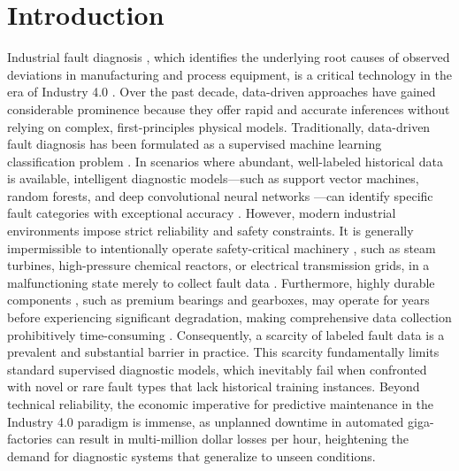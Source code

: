\section{Introduction}

Industrial fault diagnosis \cite{precup2015overview}, which identifies the underlying root causes of observed deviations in manufacturing and process equipment, is a critical technology in the era of Industry 4.0 \cite{precup2015overview}. Over the past decade, data-driven approaches have gained considerable prominence because they offer rapid and accurate inferences without relying on complex, first-principles physical models. Traditionally, data-driven fault diagnosis \cite{zhao2021semisupervised} has been formulated as a supervised machine learning classification problem \cite{zhao2021semisupervised,du2023fault} \cite{wang2020deep}. In scenarios where abundant, well-labeled historical data is available, intelligent diagnostic models—such as support vector machines, random forests, and deep convolutional neural networks \cite{he2016deep}—can identify specific fault categories with exceptional accuracy \cite{wang2020deep}. However, modern industrial environments impose strict reliability and safety constraints. It is generally impermissible to intentionally operate safety-critical machinery \cite{lee2014prognostics}, such as steam turbines, high-pressure chemical reactors, or electrical transmission grids, in a malfunctioning state merely to collect fault data \cite{wang2020deep}. Furthermore, highly durable components \cite{zhang2022intelligent}, such as premium bearings and gearboxes, may operate for years before experiencing significant degradation, making comprehensive data collection prohibitively time-consuming \cite{wang2020deep}. Consequently, a scarcity of labeled fault data is a prevalent and substantial barrier in practice. This scarcity fundamentally limits standard supervised diagnostic models, which inevitably fail when confronted with novel or rare fault types that lack historical training instances. Beyond technical reliability, the economic imperative for predictive maintenance in the Industry 4.0 paradigm is immense, as unplanned downtime in automated giga-factories can result in multi-million dollar losses per hour, heightening the demand for diagnostic systems that generalize to unseen conditions.

